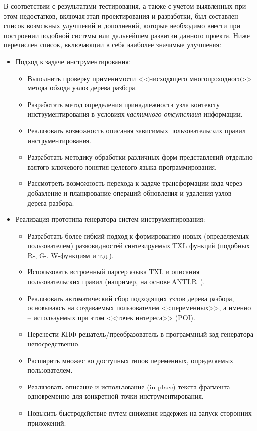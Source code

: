 В соответствии с результатами тестирования, а также с учетом выявленных при этом недостатков, включая этап проектирования и разработки, был составлен список возможных улучшений и дополнений, которые необходимо внести при построении подобной системы или дальнейшем развитии данного проекта.
Ниже перечислен список, включающий в себя наиболее значимые улучшения:

\begin{itemize}[noitemsep]
  \item Подход к задаче инструментирования:
    \begin{itemize}[noitemsep]
        \item Выполнить проверку применимости <<нисходящего многопроходного>> метода обхода узлов дерева разбора.
        \item Разработать метод определения принадлежности узла контексту инструментирования в условиях \textit{частичного отсутствия} информации.
        \item Реализовать возможность описания зависимых пользовательских правил инструментирования.
        \item Разработать методику обработки различных форм представлений отдельно взятого ключевого понятия целевого языка программирования.
        \item Рассмотреть возможность перехода к задаче трансформации кода через добавление и планирование операций обновления и удаления узлов дерева разбора.
    \end{itemize}

  \item Реализация прототипа генератора систем инструментирования:
    \begin{itemize}[noitemsep]
      \item Разработать более гибкий подход к формированию новых (определяемых пользователем) разновидностей синтезируемых TXL функций (подобных R-, G-, W-функциям и т.д.).
      \item Использовать встроенный парсер языка TXL и описания пользовательских правил (например, на основе ANTLR~\cite{antlr}).
      \item Реализовать автоматический сбор подходящих узлов дерева разбора, основываясь на создаваемых пользователем <<переменных>>, а именно -- используемых при этом <<точек интереса>> (POI).
      \item Перенести КНФ решатель/преобразователь в программный код генератора непосредственно.
      \item Расширить множество доступных типов переменных, определяемых пользователем.
      \item Реализовать описание и использование (in-place) текста фрагмента одновременно для конкретной точки инструментирования.
      \item Повысить быстродействие путем снижения издержек на запуск сторонних приложений.
    \end{itemize}
\end{itemize}

